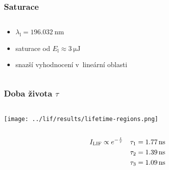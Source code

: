 \documentclass{beamer}
\newcommand\tim{t}
\newcommand\lifetime{\tau}
\newcommand\itylif{I_\text{LIF}}
\newcommand\en{E}
\newcommand\enlaser{\en_\text{l}}
\newcommand\wavelen{\lambda}
\newcommand\wavelenlaser{\wavelen_\text{l}}
\begin{document}
\begin{frame}
	\frametitle{Saturace}
	\begin{columns}[c]
		\begin{column}{0.38\textwidth}
			\begin{itemize}
				\item $\wavelenlaser = \SI{196.032}{\nano\metre}$
				\item saturace od $\enlaser \approx \SI{3}{\micro\joule}$
				\item snazší vyhodnocení v~lineární oblasti
			\end{itemize}
		\end{column}
		\begin{column}{0.58\textwidth}
		\end{column}
	\end{columns}
\end{frame}

\begin{frame}
	\frametitle{Doba života $\lifetime$}
	\begin{columns}[c]
		\begin{column}{0.38\textwidth}
			\texttt{[image: ../lif/results/lifetime-regions.png]}
		\end{column}
		\begin{column}{0.58\textwidth}
		\end{column}
	\end{columns}
	\begin{align*}
		\itylif &\propto \eu^{-\frac{\tim}{\lifetime}}
		& \lifetime_1 &= \SI{1.77}{\nano\second} \\
		& & \lifetime_2 &= \SI{1.39}{\nano\second} \\
		& & \lifetime_3 &= \SI{1.09}{\nano\second}
	\end{align*}
\end{frame}

\newcommand\vol{V}
\newcommand\freq{\nu}
\newcommand\dens{n}
\newcommand\lifsens{D_\text{F}}
\newcommand\rayleighsens{D_\text{R}}
\newcommand\lifsignal{M_\text{t}}
\newcommand\rayleighsignal{M_\text{R}}
\newcommand\rayleighxsec{\dv{\sigma_\text{R}}{\Omega}}
\newcommand\enrayleigh{E_\text{lR}}
\newcommand\specoverlap{\kappa}
\renewcommand\dd[1]{\,\mathsf{d}#1}
\renewcommand\dv[2]{\frac{\text{d}#1}{\text{d}#2}}
\end{document}
